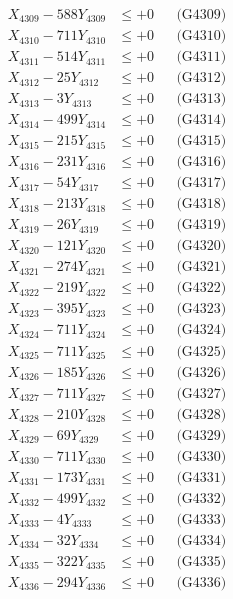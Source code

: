 \documentclass[a4paper,10pt]{article}
\begin{document}
{\begin{align}
X_{4309} - 588Y_{4309} &\leq +0 && \text{(G4309)} \\
X_{4310} - 711Y_{4310} &\leq +0 && \text{(G4310)} \\
\allowbreak
X_{4311} - 514Y_{4311} &\leq +0 && \text{(G4311)} \\
X_{4312} - 25Y_{4312} &\leq +0 && \text{(G4312)} \\
X_{4313} - 3Y_{4313} &\leq +0 && \text{(G4313)} \\
X_{4314} - 499Y_{4314} &\leq +0 && \text{(G4314)} \\
X_{4315} - 215Y_{4315} &\leq +0 && \text{(G4315)} \\
X_{4316} - 231Y_{4316} &\leq +0 && \text{(G4316)} \\
X_{4317} - 54Y_{4317} &\leq +0 && \text{(G4317)} \\
X_{4318} - 213Y_{4318} &\leq +0 && \text{(G4318)} \\
X_{4319} - 26Y_{4319} &\leq +0 && \text{(G4319)} \\
X_{4320} - 121Y_{4320} &\leq +0 && \text{(G4320)} \\
\allowbreak
X_{4321} - 274Y_{4321} &\leq +0 && \text{(G4321)} \\
X_{4322} - 219Y_{4322} &\leq +0 && \text{(G4322)} \\
X_{4323} - 395Y_{4323} &\leq +0 && \text{(G4323)} \\
X_{4324} - 711Y_{4324} &\leq +0 && \text{(G4324)} \\
X_{4325} - 711Y_{4325} &\leq +0 && \text{(G4325)} \\
X_{4326} - 185Y_{4326} &\leq +0 && \text{(G4326)} \\
X_{4327} - 711Y_{4327} &\leq +0 && \text{(G4327)} \\
X_{4328} - 210Y_{4328} &\leq +0 && \text{(G4328)} \\
X_{4329} - 69Y_{4329} &\leq +0 && \text{(G4329)} \\
X_{4330} - 711Y_{4330} &\leq +0 && \text{(G4330)} \\
\allowbreak
X_{4331} - 173Y_{4331} &\leq +0 && \text{(G4331)} \\
X_{4332} - 499Y_{4332} &\leq +0 && \text{(G4332)} \\
X_{4333} - 4Y_{4333} &\leq +0 && \text{(G4333)} \\
X_{4334} - 32Y_{4334} &\leq +0 && \text{(G4334)} \\
X_{4335} - 322Y_{4335} &\leq +0 && \text{(G4335)} \\
X_{4336} - 294Y_{4336} &\leq +0 && \text{(G4336)} \\

\end{align}}
\end{document}
